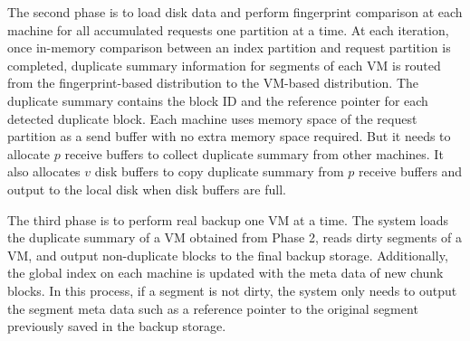The second phase is to load disk data and perform fingerprint comparison at each machine for  all accumulated 
requests one partition at a time.
At each iteration, once in-memory comparison between an index partition and request partition is completed,  
duplicate summary information for segments of each VM is routed from the fingerprint-based distribution  to the
VM-based distribution.  The duplicate summary contains the block ID and  the reference pointer for each detected duplicate block.   
Each machine uses memory space of the request partition as a send buffer with no extra memory space required.
But it needs to allocate $p$ receive buffers to collect duplicate summary from other machines.
It also allocates $v$ disk buffers to copy duplicate summary from $p$ receive buffers and output to the local disk
when disk buffers are full.


The third phase is to perform real backup one VM at a time.
The system loads the duplicate summary of a VM obtained from Phase 2, 
reads  dirty segments of a VM, and output non-duplicate blocks to the final backup 
storage. Additionally, the global index on each machine is updated with the meta data of new chunk blocks. 
In this process, if a segment is not dirty, the system only needs to output the segment meta data 
such as a reference pointer to the original segment previously saved in the backup storage.  

